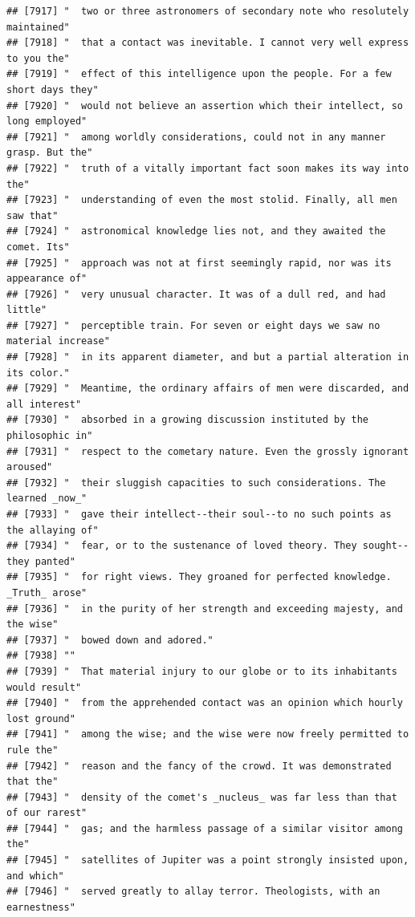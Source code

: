 \documentclass{article}\usepackage[]{graphicx}\usepackage[]{color}
\makeatletter
\newenvironment{kframe}{%
 \def\at@end@of@kframe{}%
 \ifinner\ifhmode%
  \def\at@end@of@kframe{\end{minipage}}%
  \begin{minipage}{\columnwidth}%
 \fi\fi%
 \def\FrameCommand##1{\hskip\@totalleftmargin \hskip-\fboxsep
 \colorbox{shadecolor}{##1}\hskip-\fboxsep
     \hskip-\linewidth \hskip-\@totalleftmargin \hskip\columnwidth}%
 \MakeFramed {\advance\hsize-\width
   \@totalleftmargin\z@ \linewidth\hsize
   \@setminipage}}%
 {\par\unskip\endMakeFramed%
 \at@end@of@kframe}
\newenvironment{knitrout}{}{} %
\makeatother
\begin{document}
\begin{knitrout}
\begin{kframe}
\begin{verbatim}
## [7917] "  two or three astronomers of secondary note who resolutely maintained"      
## [7918] "  that a contact was inevitable. I cannot very well express to you the"      
## [7919] "  effect of this intelligence upon the people. For a few short days they"    
## [7920] "  would not believe an assertion which their intellect, so long employed"    
## [7921] "  among worldly considerations, could not in any manner grasp. But the"      
## [7922] "  truth of a vitally important fact soon makes its way into the"             
## [7923] "  understanding of even the most stolid. Finally, all men saw that"          
## [7924] "  astronomical knowledge lies not, and they awaited the comet. Its"          
## [7925] "  approach was not at first seemingly rapid, nor was its appearance of"      
## [7926] "  very unusual character. It was of a dull red, and had little"              
## [7927] "  perceptible train. For seven or eight days we saw no material increase"    
## [7928] "  in its apparent diameter, and but a partial alteration in its color."      
## [7929] "  Meantime, the ordinary affairs of men were discarded, and all interest"    
## [7930] "  absorbed in a growing discussion instituted by the philosophic in"         
## [7931] "  respect to the cometary nature. Even the grossly ignorant aroused"         
## [7932] "  their sluggish capacities to such considerations. The learned _now_"       
## [7933] "  gave their intellect--their soul--to no such points as the allaying of"    
## [7934] "  fear, or to the sustenance of loved theory. They sought--they panted"      
## [7935] "  for right views. They groaned for perfected knowledge. _Truth_ arose"      
## [7936] "  in the purity of her strength and exceeding majesty, and the wise"         
## [7937] "  bowed down and adored."                                                    
## [7938] ""                                                                            
## [7939] "  That material injury to our globe or to its inhabitants would result"      
## [7940] "  from the apprehended contact was an opinion which hourly lost ground"      
## [7941] "  among the wise; and the wise were now freely permitted to rule the"        
## [7942] "  reason and the fancy of the crowd. It was demonstrated that the"           
## [7943] "  density of the comet's _nucleus_ was far less than that of our rarest"     
## [7944] "  gas; and the harmless passage of a similar visitor among the"              
## [7945] "  satellites of Jupiter was a point strongly insisted upon, and which"       
## [7946] "  served greatly to allay terror. Theologists, with an earnestness"          

\end{verbatim}
\end{kframe}
\end{knitrout}
\end{document}
